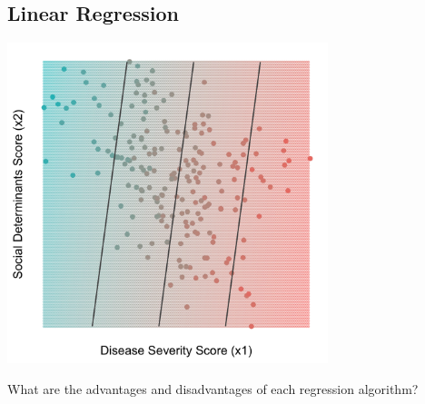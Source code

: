 \subsection{Linear Regression}


\begin{center}
\includegraphics[width=0.7\textwidth]{img/esl-reg-linear.png}
\end{center}

\begin{question}{}
What are the advantages and disadvantages of each regression algorithm?
\end{question}

